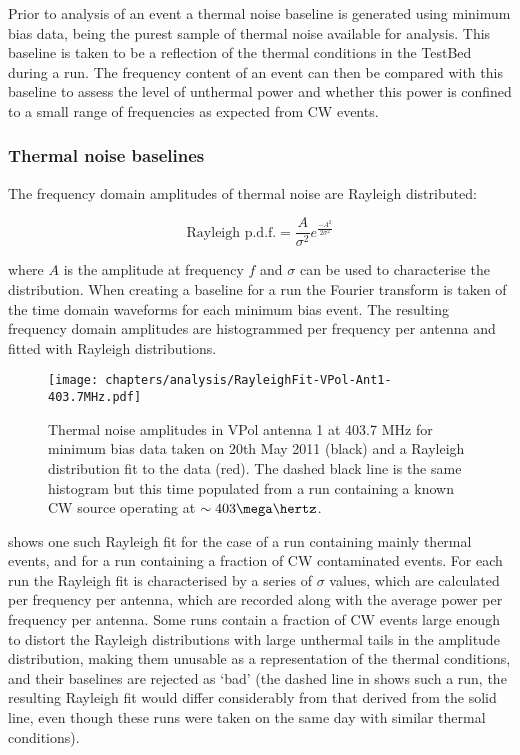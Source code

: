 Prior to analysis of an event a thermal noise baseline is generated using minimum bias data, being the purest sample of thermal noise available for analysis. This baseline is taken to be a reflection of the thermal conditions in the TestBed during a run. The frequency content of an event can then be compared with this baseline to assess the level of unthermal power and whether this power is confined to a small range of frequencies as expected from CW events.

\subsubsection{Thermal noise baselines}
\label{sec:Analysis:CWRemoval:Baselines}

The frequency domain amplitudes of thermal noise are Rayleigh distributed:

\begin{equation}
  \mbox{Rayleigh p.d.f.} = \frac{A}{\sigma^{2}}e^{\frac{-A^{2}}{2\sigma^{2}}}
  \label{eq:Analysis:CWRemoval:Rayleigh-pdf}
\end{equation}

\noindent where $A$ is the amplitude at frequency $f$ and $\sigma$ can be used to characterise the distribution. When creating a baseline for a run the Fourier transform is taken of the time domain waveforms for each minimum bias event. The resulting frequency domain amplitudes are histogrammed per frequency per antenna and fitted with Rayleigh distributions.


\begin{figure}[htpb]
  \centering
  \texttt{[image: chapters/analysis/RayleighFit-VPol-Ant1-403.7MHz.pdf]}
  \caption{Thermal noise amplitudes in VPol antenna 1 at 403.7 MHz for minimum bias data taken on 20th May 2011 (black) and a Rayleigh distribution fit to the data (red). The dashed black line is the same histogram but this time populated from a run containing a known CW source operating at $\sim 403 \mega \hertz$.}
  \label{fig:analysis:CWRemoval:Baselines:Rayleigh-Fit}
\end{figure}



 shows one such Rayleigh fit for the case of a run containing mainly thermal events, and for a run containing a fraction of CW contaminated events. For each run the Rayleigh fit is characterised by a series of $\sigma$ values, which are calculated per frequency per antenna, which are recorded along with the average power per frequency per antenna. Some runs contain a fraction of CW events large enough to distort the Rayleigh distributions with large unthermal tails in the amplitude distribution, making them unusable as a representation of the thermal conditions, and their baselines are rejected as `bad' (the dashed line in  shows such a run, the resulting Rayleigh fit would differ considerably from that derived from the solid line, even though these runs were taken on the same day with similar thermal conditions). 

